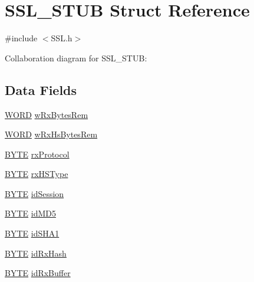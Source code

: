 \hypertarget{struct_s_s_l___s_t_u_b}{}\section{S\+S\+L\+\_\+\+S\+T\+U\+B Struct Reference}
\label{struct_s_s_l___s_t_u_b}


{\ttfamily \#include $<$S\+S\+L.\+h$>$}



Collaboration diagram for S\+S\+L\+\_\+\+S\+T\+U\+B\+:
\subsection*{Data Fields}
\begin{DoxyCompactItemize}
\item 
\hyperlink{_generic_type_defs_8h_a2b0e863dadf920709ec53d9088ee7c91}{W\+O\+R\+D} \hyperlink{struct_s_s_l___s_t_u_b_a997edf462693caad9a81263e4bf782dd}{w\+Rx\+Bytes\+Rem}
\item 
\hyperlink{_generic_type_defs_8h_a2b0e863dadf920709ec53d9088ee7c91}{W\+O\+R\+D} \hyperlink{struct_s_s_l___s_t_u_b_aa421624d6492d37567ef5ef751874562}{w\+Rx\+Hs\+Bytes\+Rem}
\item 
\hyperlink{_generic_type_defs_8h_a4ae1dab0fb4b072a66584546209e7d58}{B\+Y\+T\+E} \hyperlink{struct_s_s_l___s_t_u_b_aaee36478bcc1ac887daf74fdeb261ff5}{rx\+Protocol}
\item 
\hyperlink{_generic_type_defs_8h_a4ae1dab0fb4b072a66584546209e7d58}{B\+Y\+T\+E} \hyperlink{struct_s_s_l___s_t_u_b_ac8ccd10ba778faceebffec1270b3b8ad}{rx\+H\+S\+Type}
\item 
\hyperlink{_generic_type_defs_8h_a4ae1dab0fb4b072a66584546209e7d58}{B\+Y\+T\+E} \hyperlink{struct_s_s_l___s_t_u_b_a8e658c1a1dc8693c6af7fae4e04dff72}{id\+Session}
\item 
\hyperlink{_generic_type_defs_8h_a4ae1dab0fb4b072a66584546209e7d58}{B\+Y\+T\+E} \hyperlink{struct_s_s_l___s_t_u_b_a9814ac9d8dea201169d5a03e594d9905}{id\+M\+D5}
\item 
\hyperlink{_generic_type_defs_8h_a4ae1dab0fb4b072a66584546209e7d58}{B\+Y\+T\+E} \hyperlink{struct_s_s_l___s_t_u_b_a90439b9bee90b4a85feaa8061d9216ba}{id\+S\+H\+A1}
\item 
\hyperlink{_generic_type_defs_8h_a4ae1dab0fb4b072a66584546209e7d58}{B\+Y\+T\+E} \hyperlink{struct_s_s_l___s_t_u_b_a5e51523c4e85d8b72e85cefcf68d7bcb}{id\+Rx\+Hash}
\item 
\hyperlink{_generic_type_defs_8h_a4ae1dab0fb4b072a66584546209e7d58}{B\+Y\+T\+E} \hyperlink{struct_s_s_l___s_t_u_b_a1febc910b476fd42d94b27275372d241}{id\+Rx\+Buffer}

\end{DoxyCompactItemize}
